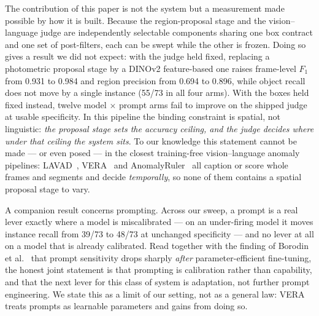 The contribution of this paper is not the system but a measurement made
possible by how it is built. Because the region-proposal stage and the
vision--language judge are independently selectable components sharing one box
contract and one set of post-filters, each can be swept while the other is
frozen. Doing so gives a result we did not expect: with the judge held fixed,
replacing a photometric proposal stage by a DINOv2 feature-based one raises
frame-level $F_1$ from 0.931 to 0.984 and region precision from 0.694 to 0.896,
while object recall does not move by a single instance (55/73 in all four
arms). With the boxes held fixed instead, twelve model $\times$ prompt arms
fail to improve on the shipped judge at usable specificity. In this pipeline
the binding constraint is spatial, not linguistic: \emph{the proposal stage
sets the accuracy ceiling, and the judge decides where under that ceiling the
system sits}. To our knowledge this statement cannot be made --- or even posed
--- in the closest training-free vision--language anomaly pipelines:
LAVAD~\cite{Zanella_2024}, VERA~\cite{Ye_2025} and
AnomalyRuler~\cite{Yang_2024} all caption or score whole frames and segments
and decide \emph{temporally}, so none of them contains a spatial proposal
stage to vary.

A companion result concerns prompting. Across our sweep, a prompt is a real
lever exactly where a model is miscalibrated --- on an under-firing model it
moves instance recall from 39/73 to 48/73 at unchanged specificity --- and no
lever at all on a model that is already calibrated. Read together with the
finding of Borodin et al.~\cite{Borodin_2025} that prompt sensitivity drops
sharply \emph{after} parameter-efficient fine-tuning, the honest joint
statement is that prompting is calibration rather than capability, and that the
next lever for this class of system is adaptation, not further prompt
engineering. We state this as a limit of our setting, not as a general law:
VERA~\cite{Ye_2025} treats prompts as learnable parameters and gains from doing
so.

